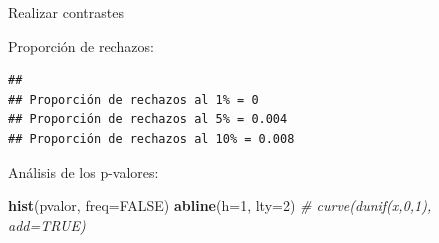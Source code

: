 \documentclass[]{book}
\newenvironment{Shaded}{\begin{snugshade}}{\end{snugshade}}
\newcommand{\KeywordTok}[1]{\textcolor[rgb]{0.13,0.29,0.53}{\textbf{#1}}}
\newcommand{\DataTypeTok}[1]{\textcolor[rgb]{0.13,0.29,0.53}{#1}}
\newcommand{\DecValTok}[1]{\textcolor[rgb]{0.00,0.00,0.81}{#1}}
\newcommand{\FloatTok}[1]{\textcolor[rgb]{0.00,0.00,0.81}{#1}}
\newcommand{\CharTok}[1]{\textcolor[rgb]{0.31,0.60,0.02}{#1}}
\newcommand{\StringTok}[1]{\textcolor[rgb]{0.31,0.60,0.02}{#1}}
\newcommand{\CommentTok}[1]{\textcolor[rgb]{0.56,0.35,0.01}{\textit{#1}}}
\newcommand{\OtherTok}[1]{\textcolor[rgb]{0.56,0.35,0.01}{#1}}
\newcommand{\ControlFlowTok}[1]{\textcolor[rgb]{0.13,0.29,0.53}{\textbf{#1}}}
\newcommand{\OperatorTok}[1]{\textcolor[rgb]{0.81,0.36,0.00}{\textbf{#1}}}
\newcommand{\NormalTok}[1]{#1}
\theoremstyle{definition}
\theoremstyle{definition}
\theoremstyle{definition}
\theoremstyle{remark}
\begin{document}
\begin{enumerate}
  Realizar contrastes

\begin{Shaded}
\end{Shaded}

  Proporción de rechazos:

\begin{Shaded}
\end{Shaded}

\begin{verbatim}
## 
## Proporción de rechazos al 1% = 0 
## Proporción de rechazos al 5% = 0.004 
## Proporción de rechazos al 10% = 0.008
\end{verbatim}

  Análisis de los p-valores:

\begin{Shaded}
\begin{Highlighting}[]
\KeywordTok{hist}\NormalTok{(pvalor, }\DataTypeTok{freq=}\OtherTok{FALSE}\NormalTok{)}
\KeywordTok{abline}\NormalTok{(}\DataTypeTok{h=}\DecValTok{1}\NormalTok{, }\DataTypeTok{lty=}\DecValTok{2}\NormalTok{)   }\CommentTok{# curve(dunif(x,0,1), add=TRUE)}
\end{Highlighting}
\end{Shaded}


\end{enumerate}
\end{document}
